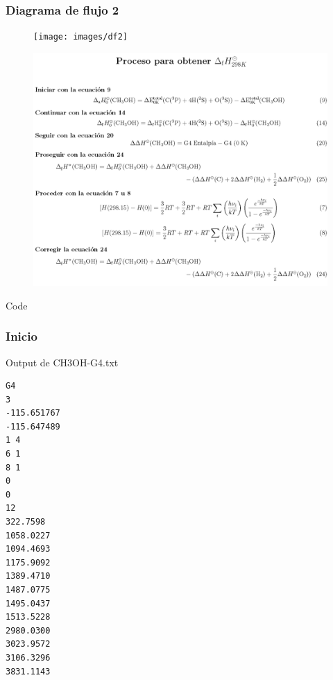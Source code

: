 \documentclass{beamer}
\begin{document}
\begin{frame}
\frametitle{Diagrama de flujo 2}
\begin{center}
\begin{figure}[h!]
\texttt{[image: images/df2]}
\end{figure}
\end{center}
\end{frame}
\begin{frame}

\begin{center}
\begin{figure}[h]
\includegraphics[scale=.5]{images/pe}
\end{figure}
\end{center}
\end{frame}
\begin{frame}[fragile]{Code}
\frametitle{Inicio}

\begin{block}{Output de CH3OH-G4.txt}
\begin{lstlisting}
G4
3
-115.651767
-115.647489
1 4
6 1
8 1
0
0
12
322.7598
1058.0227
1094.4693
1175.9092
1389.4710
1487.0775
1495.0437
1513.5228
2980.0300
3023.9572
3106.3296
3831.1143
\end{lstlisting}
\end{block}
\end{frame}
\end{document}
